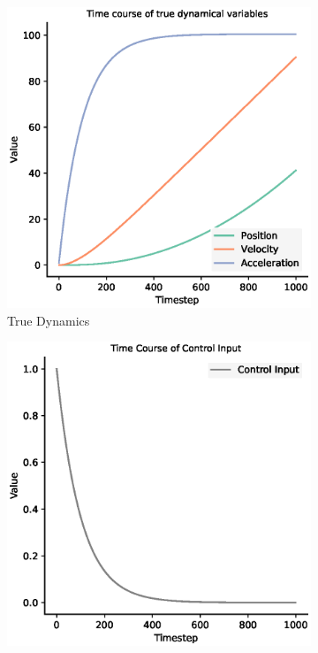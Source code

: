 \begin{figure}[H]
 \begin{subfigure}{0.49\textwidth}
 \centering
 \includegraphics[width=.95\linewidth]{chapter_3_figures/True_dynamics.eps}
 \caption{True Dynamics}
 \end{subfigure}%
 \begin{subfigure}{0.49\textwidth}
 \centering
 \includegraphics[width=.95\linewidth]{chapter_3_figures/Control_Input.eps}

\end{subfigure}
\end{figure}
